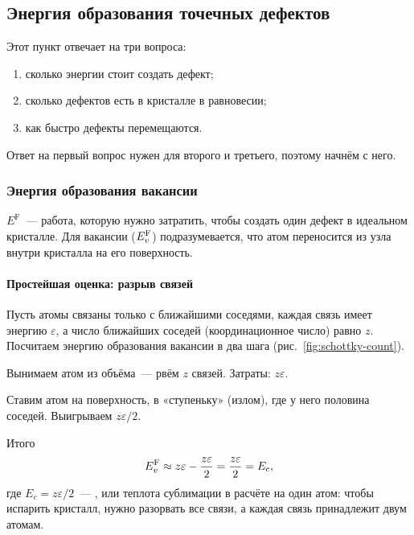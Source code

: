 \subsection{Энергия образования точечных дефектов}\label{ssec:formation}

Этот пункт отвечает на три вопроса:
\begin{enumerate}[label=\arabic*)]
\item сколько энергии стоит создать дефект;
\item сколько дефектов есть в кристалле в равновесии;
\item как быстро дефекты перемещаются.
\end{enumerate}
Ответ на первый вопрос нужен для второго и третьего, поэтому начнём с него.

\subsubsection{Энергия образования вакансии}

\begin{opredelenie}
 $E^{\mathrm F}$~— работа,
которую нужно затратить, чтобы создать один дефект в идеальном кристалле.
Для вакансии ($E_{v}^{\mathrm{F}}$) подразумевается, что атом переносится из узла
внутри кристалла на его поверхность.
\end{opredelenie}

\paragraph{Простейшая оценка: разрыв связей}
Пусть атомы связаны только с ближайшими соседями, каждая связь имеет
энергию $\varepsilon$, а число ближайших соседей (координационное число)
равно $z$. Посчитаем энергию образования вакансии в два шага
(рис.~\ref{fig:schottky-count}).

\begin{shagi}
\item Вынимаем атом из объёма~— рвём $z$ связей. Затраты: $z\varepsilon$.
\item Ставим атом на поверхность, в «ступеньку» (излом), где у него
половина соседей. Выигрываем $z\varepsilon/2$.
\end{shagi}
Итого
\begin{equation}\label{eq:EvF-bond}
E_{v}^{\mathrm{F}} \approx z\varepsilon-\frac{z\varepsilon}{2}=\frac{z\varepsilon}{2}=E_c ,
\end{equation}
где $E_c=z\varepsilon/2$~— , или теплота
сублимации в расчёте на один атом: чтобы испарить кристалл, нужно разорвать
все связи, а каждая связь принадлежит двум атомам.

